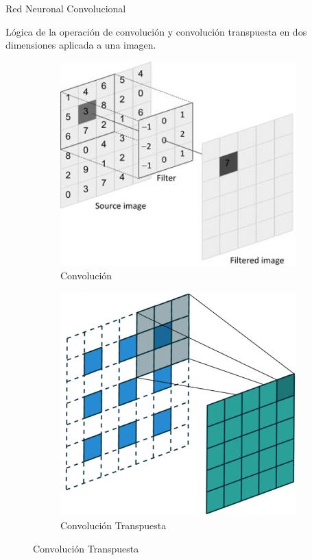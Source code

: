 \documentclass[12pt,aspectratio=169]{beamer}
\begin{document}
\begin{frame}{Red Neuronal Convolucional}

    Lógica de la operación de convolución y convolución transpuesta en dos dimensiones aplicada a una imagen.

    \begin{figure}[h]
        \begin{subfigure}{0.45\textwidth}
            \centering
            \includegraphics[scale=0.325]{figs/conv_2d.jpg}  
            \caption{Convolución}
        \end{subfigure}
        \begin{subfigure}{0.45\textwidth}
            \centering
            \includegraphics[scale=0.30]{figs/trans_conv.PNG}  
            \caption{Convolución Transpuesta}
        \end{subfigure}
    \end{figure}

\end{frame}
\end{document}
